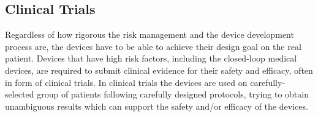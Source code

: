 \subsection{Clinical Trials}
Regardless of how rigorous the risk management and the device development process are, the devices have to be able to achieve their design goal on the real patient. Devices that have high risk factors, including the closed-loop medical devices, are required to submit clinical evidence for their safety and efficacy, often in form of clinical trials. In clinical trials the devices are used on carefully-selected group of patients following carefully designed protocols, trying to obtain unambiguous results which can support the safety and/or efficacy of the devices. 


